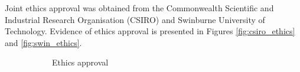 Joint ethics approval was obtained from the Commonwealth Scientific and Industrial Research Organisation (CSIRO) and Swinburne University of Technology. Evidence of ethics approval is presented in Figures \ref{fig:csiro_ethics} and \ref{fig:swin_ethics}.

\begin{figure}
\centering
\begin{subfigure}[t]{0.7\textwidth}
\centering
{}
\caption{Ethics approval}
\end{subfigure}
\hfil
\begin{subfigure}[t]{0.7\textwidth}
\centering
{}

\end{subfigure}
\end{figure}
